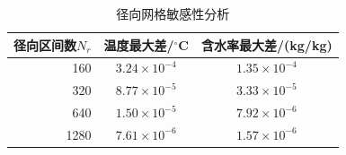 \begin{table}[H]
\centering\small
\caption{径向网格敏感性分析}
\label{tab:convergence}
\begin{tabular}{rcc}
\toprule
径向区间数$N_r$
& 温度最大差/$^\circ$C
& 含水率最大差/(kg/kg)\\
\midrule
160  & $3.24\times10^{-4}$ & $1.35\times10^{-4}$\\
320  & $8.77\times10^{-5}$ & $3.33\times10^{-5}$\\
640  & $1.50\times10^{-5}$ & $7.92\times10^{-6}$\\
1280 & $7.61\times10^{-6}$ & $1.57\times10^{-6}$\\
\bottomrule
\end{tabular}

\end{table}
